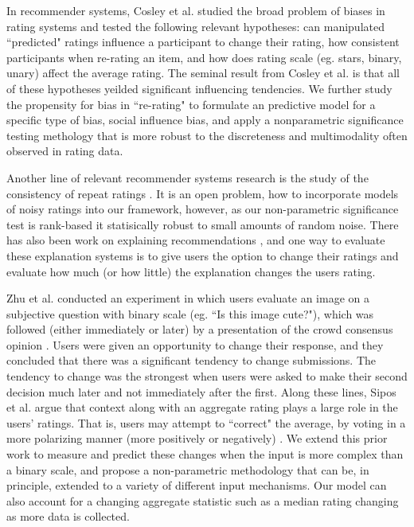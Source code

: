 In recommender systems, Cosley et al. \cite{cosley2003seeing} studied the broad problem of biases in rating systems and tested the following relevant hypotheses:  can manipulated ``predicted" ratings influence a participant to change their rating, how consistent participants when re-rating an item, and how does rating scale (eg. stars, binary, unary) affect the average rating. 
The seminal result from Cosley et al. is that all of these hypotheses yeilded significant influencing tendencies.
We further study the propensity for bias in ``re-rating" to formulate an predictive model for a specific type of bias, social influence bias, and apply a nonparametric significance testing methology that is more robust to the discreteness and multimodality often observed in rating data.

Another line of relevant recommender systems research is the study of the consistency of repeat ratings \cite{amatriain2009rate, amatriain2009like}.
It is an open problem, how to incorporate models of noisy ratings into our framework, however, as our non-parametric significance test is rank-based it statisically robust to small amounts of random noise.
There has also been work on explaining recommendations \cite{bilgic2005explaining, tintarev2007survey}, and one way to evaluate these explanation systems is to give users the option to change their ratings and evaluate how much (or how little) the explanation changes the users rating.

Zhu et al. conducted an experiment in which users evaluate an image on a subjective question with binary scale (eg. ``Is this image cute?"), which was followed (either immediately or later) by a presentation of the crowd consensus opinion \cite{zhu2012switch}. 
Users were given an opportunity to change their response, and they concluded that there was a significant tendency to change submissions.
The tendency to change was the strongest when users were asked to make their second decision much later and not immediately after the first.
Along these lines, Sipos et al. argue that context along with an aggregate rating plays a large role in the users' ratings. That is, users may attempt to ``correct" the average, by voting in a more polarizing manner (more positively or negatively) \cite{siposreview}.
We extend this prior work to measure and predict these changes when the input is more complex than a binary scale, and propose a non-parametric methodology that can be, in principle, extended to a variety of different input mechanisms.
Our model can also account for a changing aggregate statistic such as a median rating changing as more data is collected. 


